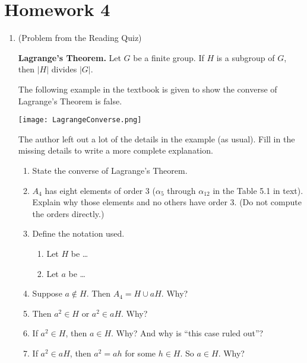 \documentclass{article}
\begin{document}
\section*{Homework 4}


\begin{enumerate}
\item (Problem from the Reading Quiz) 
    
\textbf{Lagrange's Theorem.} Let $G$ be a finite group. If $H$ is a subgroup of $G$, then $|H|$ divides $|G|$.

The following example in the textbook is given to show the converse of Lagrange's Theorem is false. 
\begin{center}
\texttt{[image: LagrangeConverse.png]}
\end{center}
\vspace{-1em}
The author left out a lot of the details in the example (as usual). Fill in the missing details to write a more complete explanation. 
\begin{enumerate}
\item State the converse of Lagrange's Theorem.

\item $A_4$ has eight elements of order 3 ($\alpha_5$ through $\alpha_{12}$ in the Table 5.1 in text).
Explain why those elements and no others have order 3. (Do not compute the orders directly.) 

\item Define the notation used.
\begin{enumerate}
    
    \item Let $H$ be \dots 
    
    \item Let $a$ be \dots 

\end{enumerate}

\item Suppose $a\not\in H$. Then $A_4=H\cup aH$. Why?

\item Then $a^2\in H$ or $a^2\in aH$. Why?

\item If $a^2\in H$, then $a\in H$. Why? And why is ``this case ruled out''?

\item If $a^2\in aH$, then $a^2=ah$ for some $h\in H$. So $a\in H$. Why?


\end{enumerate}
\end{enumerate}
\end{document}
